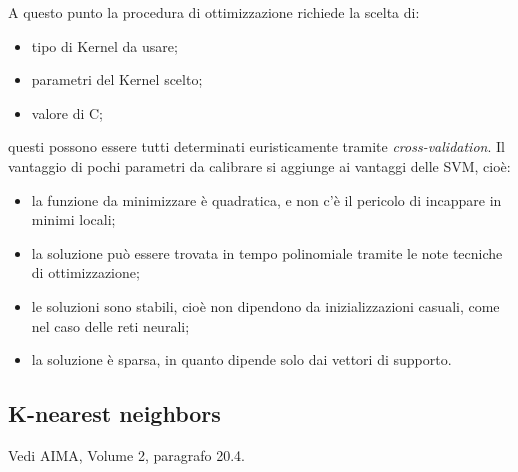 A questo punto la procedura di ottimizzazione richiede la scelta di:
\begin{itemize}
\item tipo di Kernel da usare;
\item parametri del Kernel scelto;
\item valore di C;
\end{itemize}
questi possono essere tutti determinati euristicamente tramite \emph{cross-validation}. Il vantaggio di pochi parametri da calibrare si aggiunge ai vantaggi delle SVM, cioè:
\begin{itemize}
\item la funzione da minimizzare è quadratica, e non c'è il pericolo di incappare in minimi locali;
\item la soluzione  può essere trovata in tempo polinomiale tramite le note tecniche di ottimizzazione;
\item le soluzioni sono stabili, cioè non dipendono da inizializzazioni casuali, come nel caso delle reti neurali;
\item la soluzione è sparsa, in quanto dipende solo dai vettori di supporto.
\end{itemize}

\subsection{K-nearest neighbors}
Vedi AIMA, Volume 2, paragrafo 20.4.
